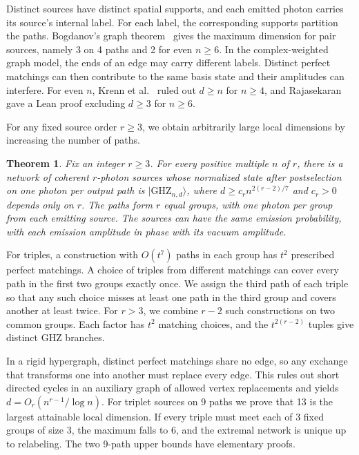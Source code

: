 \documentclass[10pt]{article}
\numberwithin{equation}{section}
\newtheorem{theorem}{Theorem}[section]
\theoremstyle{definition}
\begin{document}
Distinct sources have distinct spatial supports, and each emitted photon carries its source's internal label. For each label, the corresponding supports partition the paths. Bogdanov's graph theorem~\cite{Bogdanov2017} gives the maximum dimension for pair sources, namely 3 on 4 paths and 2 for even $n\ge6$. In the complex-weighted graph model, the ends of an edge may carry different labels. Distinct perfect matchings can then contribute to the same basis state and their amplitudes can interfere. For even $n$, Krenn et al.~\cite{KrennEtAl2026NoGo} ruled out $d\ge n$ for $n\ge4$, and Rajasekaran~\cite{Rajasekaran2026Lean} gave a Lean proof excluding $d\ge3$ for $n\ge6$.

For any fixed source order $r\ge3$, we obtain arbitrarily large local dimensions by increasing the number of paths.

\begin{theorem}\label{thm:ghz-growth}
Fix an integer $r\ge3$. For every positive multiple $n$ of $r$, there is a network of coherent $r$-photon sources whose normalized state after postselection on one photon per output path is $|\mathrm{GHZ}_{n,d}\rangle$, where $d\ge c_r n^{2(r-2)/7}$ and $c_r>0$ depends only on $r$. The paths form $r$ equal groups, with one photon per group from each emitting source. The sources can have the same emission probability, with each emission amplitude in phase with its vacuum amplitude.
\end{theorem}

For triples, a construction with $O(t^7)$ paths in each group has $t^2$ prescribed perfect matchings. A choice of triples from different matchings can cover every path in the first two groups exactly once. We assign the third path of each triple so that any such choice misses at least one path in the third group and covers another at least twice. For $r>3$, we combine $r-2$ such constructions on two common groups. Each factor has $t^2$ matching choices, and the $t^{2(r-2)}$ tuples give distinct GHZ branches.

In a rigid hypergraph, distinct perfect matchings share no edge, so any exchange that transforms one into another must replace every edge. This rules out short directed cycles in an auxiliary graph of allowed vertex replacements and yields $d=O_r(n^{r-1}/\log n)$. For triplet sources on 9 paths we prove that 13 is the largest attainable local dimension. If every triple must meet each of 3 fixed groups of size 3, the maximum falls to 6, and the extremal network is unique up to relabeling. The two 9-path upper bounds have elementary proofs.
\end{document}
